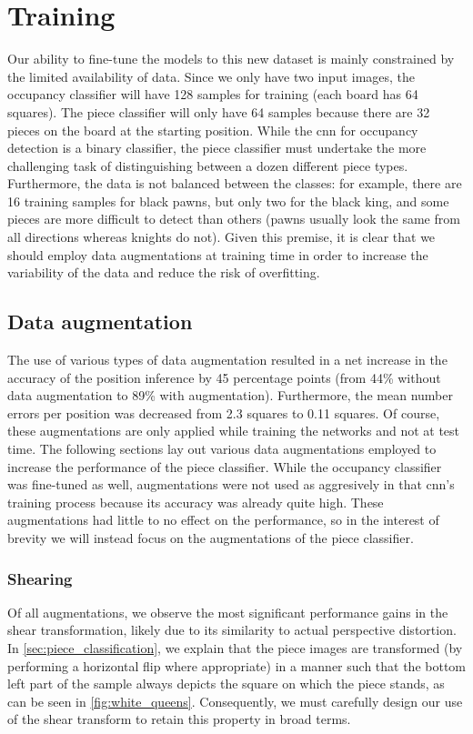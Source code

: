 \documentclass[../report.tex]{subfiles}
\begin{document}
\section{Training}
Our ability to fine-tune the models to this new dataset is mainly constrained by the limited availability of data.
Since we only have two input images, the occupancy classifier will have 128 samples for training (each board has 64 squares).
The piece classifier will only have 64 samples because there are 32 pieces on the board at the starting position.
While the \gls{cnn} for occupancy detection is a binary classifier, the piece classifier must undertake the more challenging task of distinguishing between a dozen different piece types.
Furthermore, the data is not balanced between the classes: for example, there are 16 training samples for black pawns, but only two for the black king, and some pieces are more difficult to detect than others (pawns usually look the same from all directions whereas knights do not).
Given this premise, it is clear that we should employ data augmentations at training time in order to increase the variability of the data and reduce the risk of overfitting.

\subsection{Data augmentation}
The use of various types of data augmentation resulted in a net increase in the accuracy of the position inference by 45 percentage points (from 44\% without data augmentation to 89\% with augmentation).
Furthermore, the mean number errors per position was decreased from 2.3 squares to 0.11 squares.
Of course, these augmentations are only applied while training the networks and not at test time.
The following sections lay out various data augmentations employed to increase the performance of the piece classifier.
While the occupancy classifier was fine-tuned as well, augmentations were not used as aggresively in that \gls{cnn}'s training process because its accuracy was already quite high.
These augmentations had little to no effect on the performance, so in the interest of brevity we will instead focus on the augmentations of the piece classifier.

\subsubsection{Shearing}
Of all augmentations, we observe the most significant performance gains in the shear transformation, likely due to its similarity to actual perspective distortion.
In \cref{sec:piece_classification}, we explain that the piece images are transformed (by performing a horizontal flip where appropriate) in a manner such that the bottom left part of the sample always depicts the square on which the piece stands, as can be seen in \cref{fig:white_queens}.
Consequently, we must carefully design our use of the shear transform to retain this property in broad terms.
\end{document}
